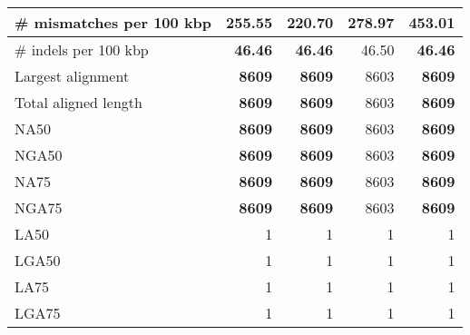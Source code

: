 \documentclass[12pt,a4paper]{article}
\begin{document}
\begin{table}[ht]
\begin{center}
\begin{tabular}{|l*{4}{|r}|}
\# mismatches per 100 kbp & 255.55 & {\bf 220.70} & 278.97 & 453.01 \\ \hline
\# indels per 100 kbp & {\bf 46.46} & {\bf 46.46} & 46.50 & {\bf 46.46} \\ \hline
Largest alignment & {\bf 8609} & {\bf 8609} & 8603 & {\bf 8609} \\ \hline
Total aligned length & {\bf 8609} & {\bf 8609} & 8603 & {\bf 8609} \\ \hline
NA50 & {\bf 8609} & {\bf 8609} & 8603 & {\bf 8609} \\ \hline
NGA50 & {\bf 8609} & {\bf 8609} & 8603 & {\bf 8609} \\ \hline
NA75 & {\bf 8609} & {\bf 8609} & 8603 & {\bf 8609} \\ \hline
NGA75 & {\bf 8609} & {\bf 8609} & 8603 & {\bf 8609} \\ \hline
LA50 & 1 & 1 & 1 & 1 \\ \hline
LGA50 & 1 & 1 & 1 & 1 \\ \hline
LA75 & 1 & 1 & 1 & 1 \\ \hline
LGA75 & 1 & 1 & 1 & 1 \\ \hline
\end{tabular}
\end{center}
\end{table}
\end{document}
